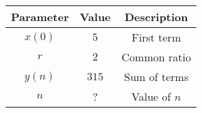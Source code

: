 \begin{tabular}{|c|c|c|}
    \hline
    \textbf{Parameter} & \textbf{Value} & \textbf{Description} \\
    \hline
    $x(0)$ & $5$ & First term \\
    \hline
    $r$ & $2$ & Common ratio \\
    \hline
    $y(n)$ & $315$ & Sum of terms \\
    \hline
    $n$ & ? & Value of $n$\\
    \hline
\end{tabular}


